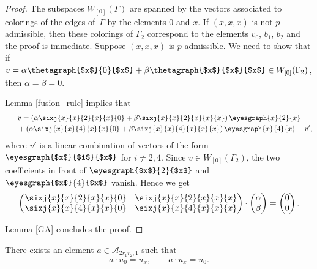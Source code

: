 \begin{proof}The subspaces $W_{[0]}(\Gamma)$ are spanned by the vectors associated to colorings of the edges of~$\Gamma$ by the elements $0$ and $x$. If $(x,x,x)$ is not $p$-admissible, then these colorings of $\Gamma_2$ correspond to the elements $v_0$, $b_1$, $b_2$ and the proof is immediate. Suppose $(x,x,x)$ is $p$-admissible. We need to show that if $v=\alpha \thetagraph{$x$}{0}{$x$} + \beta \thetagraph{$x$}{$x$}{$x$} \in W_{[0]}(\Gamma_2)$, then $\alpha=\beta = 0$.

Lemma \ref{fusion_rule} implies that
\begin{gather*}
v= \left( \alpha \sixj{x}{x}{2}{x}{x}{0} +\beta \sixj{x}{x}{2}{x}{x}{x} \right) \eyesgraph{x}{2}{x}\\
\hphantom{v=}{}+ \left( \alpha \sixj{x}{x}{4}{x}{x}{0} +\beta \sixj{x}{x}{4}{x}{x}{x} \right) \eyesgraph{x}{4}{x} + v',
\end{gather*}
where $v'$ is a linear combination of vectors of the form $\eyesgraph{$x$}{$i$}{$x$}$ for $i\neq 2,4$. Since $v\in W_{[0]}(\Gamma_2)$, the two coefficients in front of $\eyesgraph{$x$}{2}{$x$}$ and $\eyesgraph{$x$}{4}{$x$}$ vanish. Hence we get
\begin{gather*}\begin{pmatrix} \sixj{x}{x}{2}{x}{x}{0} & \sixj{x}{x}{2}{x}{x}{x} \\ \sixj{x}{x}{4}{x}{x}{0} & \sixj{x}{x}{4}{x}{x}{x} \end{pmatrix} \cdot \begin{pmatrix} \alpha \\ \beta \end{pmatrix} = \begin{pmatrix} 0\\0 \end{pmatrix}.\end{gather*}

Lemma \ref{GA} concludes the proof.
\end{proof}

\begin{Lemma}\label{lemmalacon}
There exists an element $a \in \mathcal{A}_{2r_1r_2,1}$ such that
\begin{gather*}
a\cdot u_0 = u_x, \qquad a \cdot u_x = u_0.
\end{gather*}
\end{Lemma}

